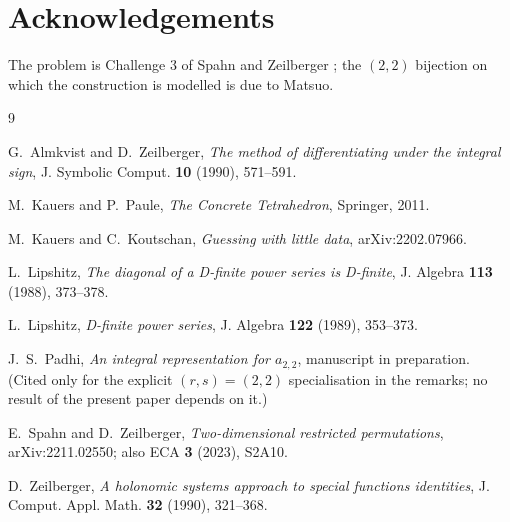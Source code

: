 \documentclass[11pt]{article}
\theoremstyle{definition}
\begin{document}
\section*{Acknowledgements}

The problem is Challenge 3 of Spahn and Zeilberger \cite{SZ}; the $(2,2)$
bijection on which the construction is modelled is due to Matsuo.

\begin{thebibliography}{9}

 G.~Almkvist and D.~Zeilberger, \emph{The method of differentiating
under the integral sign}, J. Symbolic Comput. \textbf{10} (1990), 571--591.

 M.~Kauers and P.~Paule, \emph{The Concrete Tetrahedron},
Springer, 2011.

 M.~Kauers and C.~Koutschan, \emph{Guessing with little data},
arXiv:2202.07966.

 L.~Lipshitz, \emph{The diagonal of a D-finite power
series is D-finite}, J. Algebra \textbf{113} (1988), 373--378.

 L.~Lipshitz, \emph{D-finite power series}, J. Algebra
\textbf{122} (1989), 353--373.

 J.~S.~Padhi, \emph{An integral representation for
$a_{2,2}$}, manuscript in preparation. (Cited only for the explicit
$(r,s)=(2,2)$ specialisation in the remarks; no result of the present paper
depends on it.)

 E.~Spahn and D.~Zeilberger, \emph{Two-dimensional restricted
permutations}, arXiv:2211.02550; also ECA \textbf{3} (2023), S2A10.

 D.~Zeilberger, \emph{A holonomic systems approach to
special functions identities}, J. Comput. Appl. Math. \textbf{32} (1990),
321--368.

\end{thebibliography}
\end{document}
